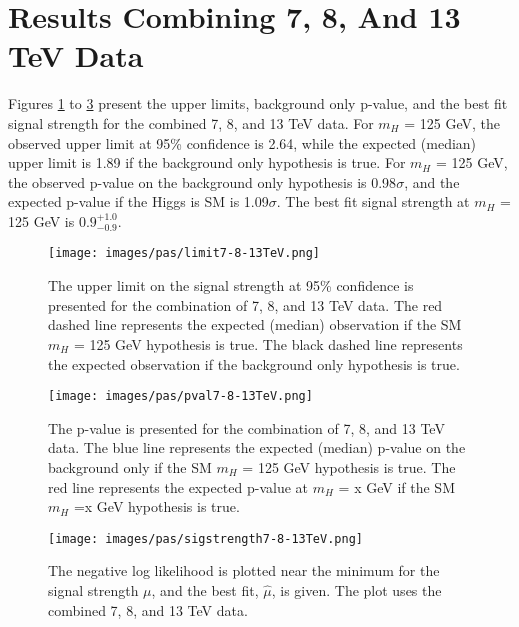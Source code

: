 \section{Results Combining 7, 8, And 13 TeV Data}
Figures \ref{fig:limit7813} to \ref{fig:signalstrength7813} present the upper limits, background only p-value, and the best fit signal strength for the combined 7, 8, and 13 TeV data. For $m_H$ = 125 GeV, the observed upper limit at 95\% confidence is 2.64, while the expected (median) upper limit is 1.89 if the background only hypothesis is true. For $m_H$ = 125 GeV, the observed p-value on the background only hypothesis is 0.98$\sigma$, and the expected p-value if the Higgs is SM is 1.09$\sigma$. The best fit signal strength at $m_H$ = 125 GeV is $0.9^{+1.0}_{-0.9}$. 
\begin{figure}[h!]
    \centering
    \texttt{[image: images/pas/limit7-8-13TeV.png]}
    \caption[The upper limit on the signal strength combining 7, 8, and 13 TeV data.]
    {The upper limit on the signal strength at 95\% confidence is presented for the combination of 7, 8, and 13 TeV data. The red dashed line represents the expected (median) observation if the SM $m_H$ = 125 GeV hypothesis is true. The black dashed line represents the expected observation if the background only hypothesis is true.}
    \label{fig:limit7813}
\end{figure}
\begin{figure}[h!]
    \centering
    \texttt{[image: images/pas/pval7-8-13TeV.png]}
    \caption[The p-value on the background only hypothesis combining 7, 8, and 13 TeV data.]
    {The p-value is presented for the combination of 7, 8, and 13 TeV data. The blue line represents the expected (median) p-value on the background only if the SM $m_H$ = 125 GeV hypothesis is true. The red line represents the expected p-value at $m_H$ = x GeV if the SM $m_H$ =x GeV hypothesis is true.}
    \label{fig:pval7813}
\end{figure}
\begin{figure}[h!]
    \centering
    \texttt{[image: images/pas/sigstrength7-8-13TeV.png]}
    \caption[The negative log likelihood for the combined 7, 8, and 13 TeV data.]
    {The negative log likelihood is plotted near the minimum for the signal strength $\mu$, and the best fit, $\hat{\mu}$, is given. The plot uses the combined 7, 8, and 13 TeV data.}
    \label{fig:signalstrength7813}
\end{figure}
